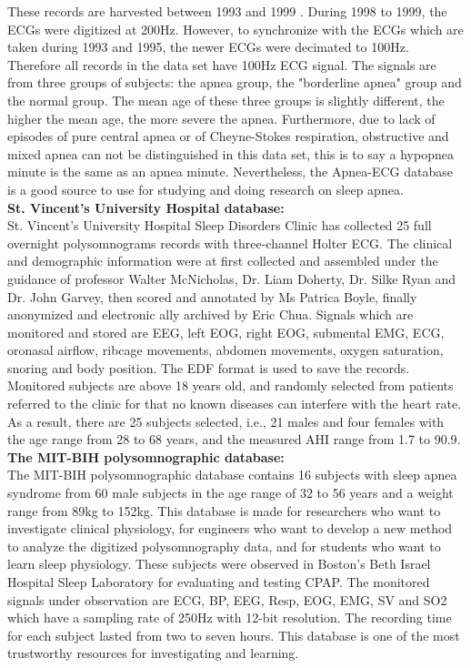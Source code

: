         These records are harvested between 1993 and 1999 \cite{Apnea_ecg_db}. During 1998 to 1999, the ECGs were digitized at 200Hz. However, to synchronize with the ECGs which are taken during 1993 and 1995, the newer ECGs were decimated to 100Hz. Therefore all records in the data set have 100Hz ECG signal. The signals are from three groups of subjects: the apnea group, the "borderline apnea" group and the normal group. The mean age of these three groups is slightly different, the higher the mean age, the more severe the apnea. Furthermore, due to lack of episodes of pure central apnea or of Cheyne-Stokes respiration, obstructive and mixed apnea can not be distinguished in this data set, this is to say a hypopnea minute is the same as an apnea minute. Nevertheless, the Apnea-ECG database is a good source to use for studying and doing research on sleep apnea.\\
        \textbf{St. Vincent's University Hospital database: }\\
        St. Vincent's University Hospital Sleep Disorders Clinic has collected 25 full overnight polysomnograms records with three-channel Holter ECG. The clinical and demographic information were at first collected and assembled under the guidance of professor Walter McNicholas, Dr. Liam Doherty, Dr. Silke Ryan and Dr. John Garvey, then scored and annotated by Ms Patrica Boyle, finally anonymized and electronic ally archived by Eric Chua. Signals which are monitored and stored are EEG, left EOG, right EOG, submental EMG, ECG, oronasal airflow, ribcage movements, abdomen movements, oxygen saturation, snoring and body position. The EDF format is used to save the records. Monitored subjects are above 18 years old, and randomly selected from patients referred to the clinic for that no known diseases can interfere with the heart rate. As a result, there are 25 subjects selected, i.e., 21 males and four females with the age range from 28 to 68 years, and the measured AHI range from 1.7 to 90.9\cite{STVinceUniversity}.\\
        \textbf{The MIT-BIH polysomnographic database: }\\
        The MIT-BIH polysomnographic database contains 16 subjects with sleep apnea syndrome from 60 male subjects in the age range of 32 to 56 years and a weight range from 89kg to 152kg\cite{MIT_BIH_slpdb}. This database is made for researchers who want to investigate clinical physiology, for engineers who want to develop a new method to analyze the digitized polysomnography data, and for students who want to learn sleep physiology. These subjects were observed in Boston's Beth Israel Hospital Sleep Laboratory for evaluating and testing CPAP. The monitored signals under observation are ECG, BP, EEG, Resp, EOG, EMG, SV and SO2 which have a sampling rate of 250Hz with 12-bit resolution. The recording time for each subject lasted from two to seven hours. This database is one of the most trustworthy resources for investigating and learning.\\
